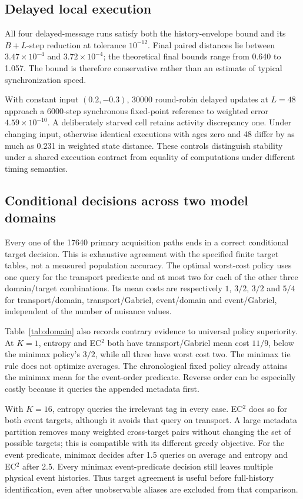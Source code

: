 \documentclass[11pt,a4paper]{article}
\theoremstyle{definition}\newtheorem{definition}[theorem]{Definition}
\begin{document}
\subsection{Delayed local execution}
All four delayed-message runs satisfy both the history-envelope bound and its $B+L$-step reduction at tolerance $10^{-12}$. Final paired distances lie between $3.47\times10^{-4}$ and $3.72\times10^{-4}$; the theoretical final bounds range from 0.640 to 1.057. The bound is therefore conservative rather than an estimate of typical synchronization speed.

With constant input $(0.2,-0.3)$, 30000 round-robin delayed updates at $L=48$ approach a 6000-step synchronous fixed-point reference to weighted error $4.59\times10^{-10}$. A deliberately starved cell retains activity discrepancy one. Under changing input, otherwise identical executions with ages zero and 48 differ by as much as 0.231 in weighted state distance. These controls distinguish stability under a shared execution contract from equality of computations under different timing semantics.
\FloatBarrier

\subsection{Conditional decisions across two model domains}\label{sec:domainresults}

Every one of the 17640 primary acquisition paths ends in a correct conditional target decision. This is exhaustive agreement with the specified finite target tables, not a measured population accuracy. The optimal worst-cost policy uses one query for the transport predicate and at most two for each of the other three domain/target combinations. Its mean costs are respectively $1$, $3/2$, $3/2$ and $5/4$ for transport/domain, transport/Gabriel, event/domain and event/Gabriel, independent of the number of nuisance values.

Table~\ref{tab:domain} also records contrary evidence to universal policy superiority. At $K=1$, entropy and EC$^2$ both have transport/Gabriel mean cost $11/9$, below the minimax policy's $3/2$, while all three have worst cost two. The minimax tie rule does not optimize averages. The chronological fixed policy already attains the minimax mean for the event-order predicate. Reverse order can be especially costly because it queries the appended metadata first.

With $K=16$, entropy queries the irrelevant tag in every case. EC$^2$ does so for both event targets, although it avoids that query on transport. A large metadata partition removes many weighted cross-target pairs without changing the set of possible targets; this is compatible with its different greedy objective. For the event predicate, minimax decides after 1.5 queries on average and entropy and EC$^2$ after 2.5. Every minimax event-predicate decision still leaves multiple physical event histories. Thus target agreement is useful before full-history identification, even after unobservable aliases are excluded from that comparison.
\end{document}
